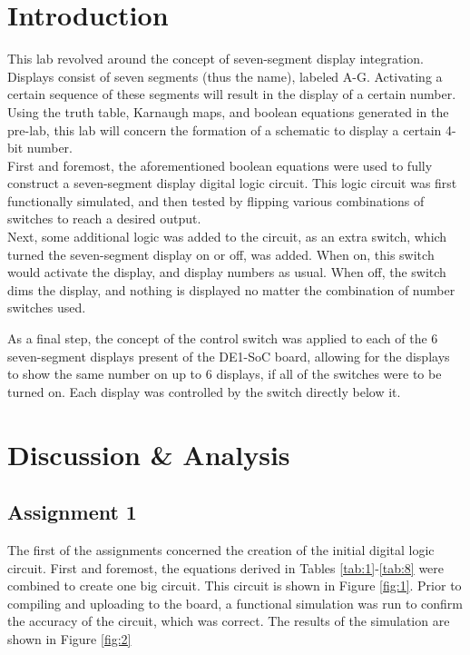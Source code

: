 \documentclass[
	letterpaper, %
	10pt, %
]{CSUniSchoolLabReport}
\begin{document}
\section{Introduction}

\hspace{.5 in} This lab revolved around the concept of seven-segment display integration. Displays consist of seven segments (thus the name), labeled A-G. Activating a certain sequence of these segments will result in the display of a certain number. Using the truth table, Karnaugh maps, and boolean equations generated in the pre-lab, this lab will concern the formation of a schematic to display a certain 4-bit number.\\

\hspace{.5 in} First and foremost, the aforementioned boolean equations were used to fully construct a seven-segment display digital logic circuit. This logic circuit was first functionally simulated, and then tested by flipping various combinations of switches to reach a desired output.\\

\hspace{.5 in} Next, some additional logic was added to the circuit, as an extra switch, which turned the seven-segment display on or off, was added. When on, this switch would activate the display, and display numbers as usual. When off, the switch dims the display, and nothing is displayed no matter the combination of number switches used.

\hspace{.5 in} As a final step, the concept of the control switch was applied to each of the 6 seven-segment displays present of the DE1-SoC board, allowing for the displays to show the same number on up to 6 displays, if all of the switches were to be turned on. Each display was controlled by the switch directly below it.

\section{Discussion \& Analysis} 

\subsection{Assignment 1}

\hspace{.5 in} The first of the assignments concerned the creation of the initial digital logic circuit. First and foremost, the equations derived in Tables \ref{tab:1}-\ref{tab:8} were combined to create one big circuit. This circuit is shown in Figure \ref{fig:1}. Prior to compiling and uploading to the board, a functional simulation was run to confirm the accuracy of the circuit, which was correct. The results of the simulation are shown in Figure \ref{fig:2}
\end{document}
